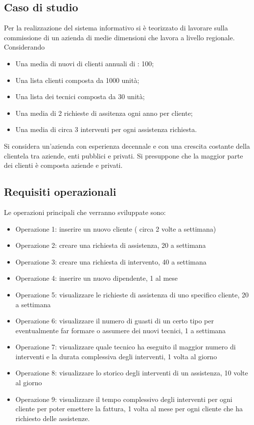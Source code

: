 \documentclass[a4paper]{article}
\begin{document}
\subsection{Caso di studio}
Per la realizzazione del sistema informativo si è teorizzato di lavorare sulla commissione di un azienda di medie dimensioni che lavora a livello regionale. \\ Considerando
\begin{itemize}
    \item Una media di nuovi di clienti annuali di : 100;
    \item Una lista clienti composta da 1000 unità;
    \item Una lista dei tecnici composta da 30 unità;
    \item Una media di 2 richieste di assitenza ogni anno per cliente;
    \item Una media di circa 3 interventi per ogni assistenza richiesta.
\end{itemize}
Si considera un'azienda con esperienza decennale e con una crescita costante della clientela tra aziende, enti pubblici e privati.  Si presuppone che la maggior parte dei clienti è composta aziende e privati.

\subsection{Requisiti operazionali}
Le operazioni principali che verranno sviluppate sono:
\begin{itemize}
    \item Operazione 1: inserire un nuovo cliente ( circa 2 volte a settimana)
    \item Operazione 2: creare una richiesta di assistenza, 20 a settimana
    \item Operazione 3: creare una richiesta di intervento, 40 a settimana
    \item Operazione 4: inserire un nuovo dipendente, 1 al mese
    \item Operazione 5: visualizzare le richieste di assistenza di uno specifico cliente, 20 a settimana
    \item Operazione 6: visualizzare il numero di guasti di un certo tipo per eventualmente far formare o assumere dei nuovi tecnici, 1 a settimana
    \item Operazione 7: visualizzare quale tecnico ha eseguito il maggior numero di interventi e la durata complessiva degli interventi, 1 volta al giorno
    \item Operazione 8: visualizzare lo storico degli interventi di un assistenza, 10 volte al giorno
    \item Operazione 9: visualizzare il tempo complessivo degli interventi per ogni cliente per poter emettere la fattura, 1 volta al mese per ogni cliente che ha richiesto delle assistenze.
\end{itemize}
\end{document}
